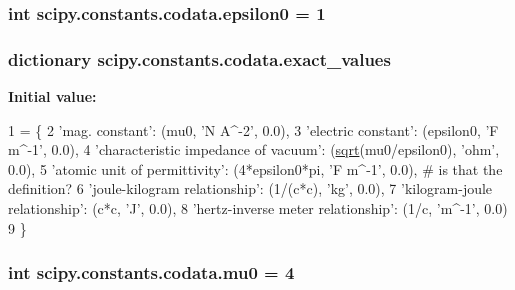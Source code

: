 \subsubsection[{epsilon0}]{\setlength{\rightskip}{0pt plus 5cm}int scipy.\+constants.\+codata.\+epsilon0 = 1}\label{namespacescipy_1_1constants_1_1codata_a51d9bf3362bbbc2576e1aeef550ed695}
\hypertarget{namespacescipy_1_1constants_1_1codata_ab2921da85ab8381d529d2907587a208b}{}
\subsubsection[{exact\+\_\+values}]{\setlength{\rightskip}{0pt plus 5cm}dictionary scipy.\+constants.\+codata.\+exact\+\_\+values}\label{namespacescipy_1_1constants_1_1codata_ab2921da85ab8381d529d2907587a208b}
{\bfseries Initial value\+:}
\begin{DoxyCode}
1 = \{
2 \textcolor{stringliteral}{'mag. constant'}: (mu0, \textcolor{stringliteral}{'N A^-2'}, 0.0),
3 \textcolor{stringliteral}{'electric constant'}: (epsilon0, \textcolor{stringliteral}{'F m^-1'}, 0.0),
4 \textcolor{stringliteral}{'characteristic impedance of vacuum'}: (\hyperlink{zeros_8h_acdb55c1010a6c379a49db0201bf55d89}{sqrt}(mu0/epsilon0), \textcolor{stringliteral}{'ohm'}, 0.0),
5 \textcolor{stringliteral}{'atomic unit of permittivity'}: (4*epsilon0*pi, \textcolor{stringliteral}{'F m^-1'}, 0.0),  \textcolor{comment}{# is that the definition?}
6 \textcolor{stringliteral}{'joule-kilogram relationship'}: (1/(c*c), \textcolor{stringliteral}{'kg'}, 0.0),
7 \textcolor{stringliteral}{'kilogram-joule relationship'}: (c*c, \textcolor{stringliteral}{'J'}, 0.0),
8 \textcolor{stringliteral}{'hertz-inverse meter relationship'}: (1/c, \textcolor{stringliteral}{'m^-1'}, 0.0)
9 \}
\end{DoxyCode}
\hypertarget{namespacescipy_1_1constants_1_1codata_ad07cc61c7172f08ff1bbc8dc1d6066e5}{}
\subsubsection[{mu0}]{\setlength{\rightskip}{0pt plus 5cm}int scipy.\+constants.\+codata.\+mu0 = 4}\label{namespacescipy_1_1constants_1_1codata_ad07cc61c7172f08ff1bbc8dc1d6066e5}
\hypertarget{namespacescipy_1_1constants_1_1codata_ae2ae2fa33bd2c495fde6185d236e168d}{}

